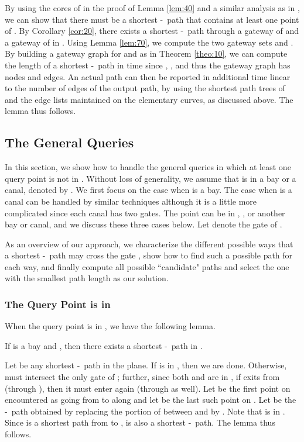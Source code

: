 \documentclass[english,runningheads,11pt]{llncs}
\def\st{-}
\newenvironment{proof}{\noindent {\textbf{Proof:}}\rm}{\hfill \rm}
\begin{document}
\begin{proof}
By using the cores of  in the proof of Lemma \ref{lem:40} and
a similar analysis as in \cite{ref:ChenSh00}, we can show that
there must be a shortest \st\
path that contains at least one point of . By
Corollary \ref{cor:20}, there exists a shortest \st\ path through a
gateway of  and a gateway of  in . Using Lemma \ref{lem:70}, we
compute the two gateway sets  and
. By building a gateway graph for  and  as
in Theorem \ref{theo:10}, we can compute the length of a
shortest \st\ path in  time since
,
, and thus
the gateway graph has  nodes and  edges.
An actual path can then be reported in additional time linear
to the number of edges of the output path, by using the shortest path
trees of  and the edge lists maintained on the elementary
curves, as discussed above.
The lemma thus follows.
\end{proof}




\subsection{The General Queries}
\label{subsec:general}

In this section, we show how to handle the general queries in which at least one query point
is not in . Without loss of generality, we assume that  is in
a bay or a canal, denoted by . We first focus on the case when
 is a bay. The case when  is a canal can be handled by similar
techniques although it is a little more complicated since each canal
has two gates. The point  can be in , ,
or another bay or canal, and we discuss these three cases below.
Let  denote the gate of .

As an overview of our approach, we characterize the different possible ways that a
shortest \st\ path may cross the gate , show how to find
such a possible path for each way, and finally compute all possible ``candidate"
paths and select the one with the smallest path length as our solution.

\subsubsection{The Query Point  is in }

When the query point  is in , we have the following lemma.

\begin{lemma}\label{lem:90}
If  is a bay and , then there exists a shortest \st\ path in .
\end{lemma}
\begin{proof}
Let  be any shortest \st\ path in the plane. If  is in , then we are
done. Otherwise,  must intersect the only gate  of ; further, since both  and
 are in , if  exits from  (through ), then it must enter  again
(through  as well).  Let  be the first point on  encountered as
going from  to  along  and let  be the last such
point on . Let  be the \st\ path obtained by replacing the portion of 
between  and  by . Note that  is in .
Since  is a
shortest path from  to ,  is also a shortest \st\ path.
The lemma thus follows.
\end{proof}
\end{document}
